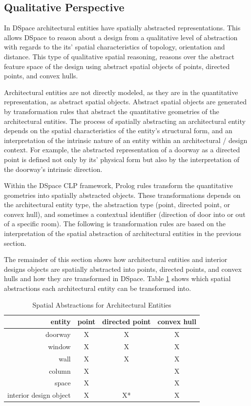 \documentclass[12pt]{ucthesis}
\begin{document}
\subsection{Qualitative Perspective}
In DSpace architectural entities have spatially abstracted representations. This allows DSpace to reason about a design from a qualitative level of abstraction with regards to the its' spatial characteristics of topology, orientation and distance. This type of qualitative spatial reasoning, reasons over the abstract feature space of the design using abstract spatial objects of points, directed points, and convex hulls. 

Architectural entities are not directly modeled, as they are in the quantitative representation, as abstract spatial objects. Abstract spatial objects are generated by transformation rules that abstract the quantitative geometries of the architectural entities. The process of spatially abstracting an architectural entity depends on the spatial characteristics of the entity's structural form, and an interpretation of the intrinsic nature of an entity within an architectural / design context. For example, the abstracted representation of a doorway as a directed point is defined not only by its' physical form but also by the interpretation of the doorway's intrinsic direction. 

Within the DSpace CLP framework, Prolog rules transform the quantitative geometries into spatially abstracted objects. These transformations depends on the architectural entity type, the abstraction type (point, directed point, or convex hull), and sometimes a contextual identifier (direction of door into or out of a specific room). The following is transformation rules are based on the interpretation of the spatial abstraction of architectural entities in the previous section.

The remainder of this section shows how architectural entities and interior designs objects are spatially abstracted into points, directed points, and convex hulls and how they are transformed in DSpace. Table \ref{spatial abstractions} shows which spatial abstractions each architectural entity can be transformed into. 

\begin{table}[H]
  \begin{center}
  \begin{tabular}{ | r | c | c | c |}
    \hline
    entity & point & directed point & convex hull\\ \hline
    doorway & X & X & X \\ \hline
    window & X & X & X \\ \hline
    wall & X & X & X \\ \hline
    column & X &  & X \\ \hline
    space & X &  & X \\ \hline
    interior design object & X & X* & X \\
    \hline
  \end{tabular}
  \end{center}
\caption{Spatial Abstractions for Architectural Entities}
\label{spatial abstractions}
\end{table} 
\end{document}
